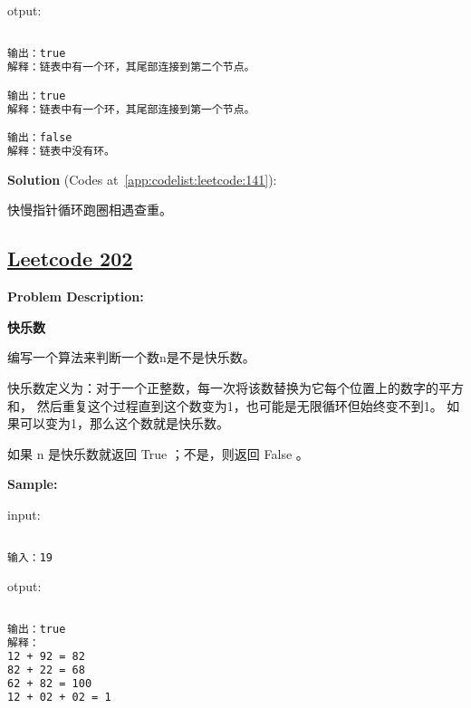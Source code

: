 otput:\par

\begin{lstlisting}[language=bash]

输出：true
解释：链表中有一个环，其尾部连接到第二个节点。

输出：true
解释：链表中有一个环，其尾部连接到第一个节点。

输出：false
解释：链表中没有环。


\end{lstlisting}

\textbf{Solution }(Codes at~\ref{app:codelist:leetcode:141}):\par

快慢指针循环跑圈相遇查重。\par



\subsection{\href{https://leetcode-cn.com/}{Leetcode 202}}\label{app:problemlist:leetcode:202}

\textbf{Problem Description:}\par

\textbf{快乐数}\par

编写一个算法来判断一个数n是不是快乐数。\par

快乐数定义为：对于一个正整数，每一次将该数替换为它每个位置上的数字的平方和，
然后重复这个过程直到这个数变为1，也可能是无限循环但始终变不到1。
如果可以变为1，那么这个数就是快乐数。\par

如果 n 是快乐数就返回 True ；不是，则返回 False 。\par


\textbf{Sample:}\par

input:\par

\begin{lstlisting}[language=bash]

输入：19


\end{lstlisting}

otput:\par

\begin{lstlisting}[language=bash]

输出：true
解释：
12 + 92 = 82
82 + 22 = 68
62 + 82 = 100
12 + 02 + 02 = 1


\end{lstlisting}

